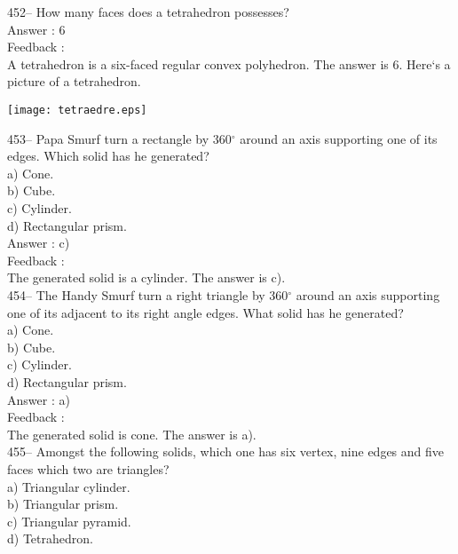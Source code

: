 ﻿\documentclass[letterpaper, 12pt]{article}
\begin{document}
452-- How many faces does a tetrahedron possesses?\\

Answer : 6\\

Feedback : \\
A tetrahedron is a six-faced regular convex polyhedron.  The answer is 6.  Here`s a picture of a tetrahedron.\\
    \begin{center}
    \texttt{[image: tetraedre.eps]}
    \end{center}


453--  Papa Smurf turn a rectangle by 360$^{\circ}$ around an axis supporting one of its edges. Which solid has he generated?\\
a) Cone.\\
b) Cube.\\
c) Cylinder.\\
d) Rectangular prism.\\


Answer : c)\\

Feedback :\\
The generated solid is a cylinder.  The answer is c).\\


454--  The Handy Smurf turn a right triangle by 360$^{\circ}$ around an axis supporting one of its adjacent to its right angle edges. What solid has he generated?\\
a) Cone.\\
b) Cube.\\
c) Cylinder.\\
d) Rectangular prism.\\

Answer : a)\\

Feedback :\\
The generated solid is cone.  The answer is a).\\

455-- Amongst the following solids, which one has six vertex, nine edges and five faces which two are triangles?\\
a) Triangular cylinder.\\
b) Triangular prism.\\
c) Triangular pyramid.\\
d) Tetrahedron.\\
\end{document}
